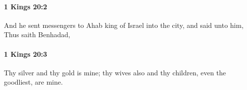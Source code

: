 		\paragraph{1 Kings 20:2} %
			\label{1KINGS-20-2}

			And he sent messengers to Ahab king of Israel into the city, and said unto him, Thus saith Benhadad,


		\paragraph{1 Kings 20:3} %
			\label{1KINGS-20-3}

			Thy silver and thy gold is mine; thy wives also and thy children, even the goodliest, are mine.


